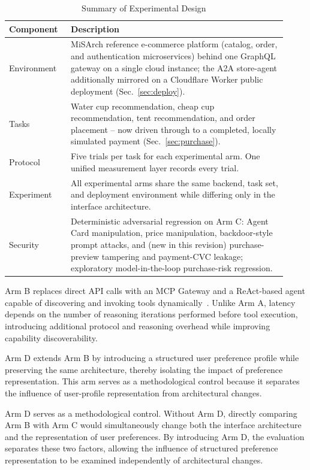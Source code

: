 \documentclass[conference]{IEEEtran}
\begin{document}
\begin{table}[t]
\caption{Summary of Experimental Design}
\label{tab:design}
\centering
\begin{tabular}{@{}p{0.20\linewidth}p{0.72\linewidth}@{}}
\toprule
\textbf{Component} & \textbf{Description} \\
\midrule
Environment & MiSArch reference e-commerce platform (catalog, order, and
  authentication microservices) behind one GraphQL gateway on a single cloud
  instance; the A2A store-agent additionally mirrored on a Cloudflare Worker
  public deployment (Sec.~\ref{sec:deploy}). \\
Tasks & Water cup recommendation, cheap cup recommendation, tent
  recommendation, and order placement -- now driven through to a completed,
  locally simulated payment (Sec.~\ref{sec:purchase}). \\
Protocol & Five trials per task for each experimental arm. One unified
  measurement layer records every trial. \\
Experiment & All experimental arms share the same backend, task set, and
  deployment environment while differing only in the interface architecture. \\
Security & Deterministic adversarial regression on Arm C: Agent Card
  manipulation, price manipulation, backdoor-style prompt attacks, and (new
  in this revision) purchase-preview tampering and payment-CVC leakage;
  exploratory model-in-the-loop purchase-risk regression. \\
\bottomrule
\end{tabular}
\end{table}

Arm B replaces direct API calls with an MCP Gateway and a ReAct-based agent
capable of discovering and invoking tools dynamically~\cite{ref3,ref8}.
Unlike Arm A, latency depends on the number of reasoning iterations performed
before tool execution, introducing additional protocol and reasoning
overhead while improving capability discoverability.

Arm D extends Arm B by introducing a structured user preference profile while
preserving the same architecture, thereby isolating the impact of preference
representation. This arm serves as a methodological control because it
separates the influence of user-profile representation from architectural
changes.

Arm D serves as a methodological control. Without Arm D, directly comparing
Arm B with Arm C would simultaneously change both the interface architecture
and the representation of user preferences. By introducing Arm D, the
evaluation separates these two factors, allowing the influence of structured
preference representation to be examined independently of architectural
changes.
\end{document}
